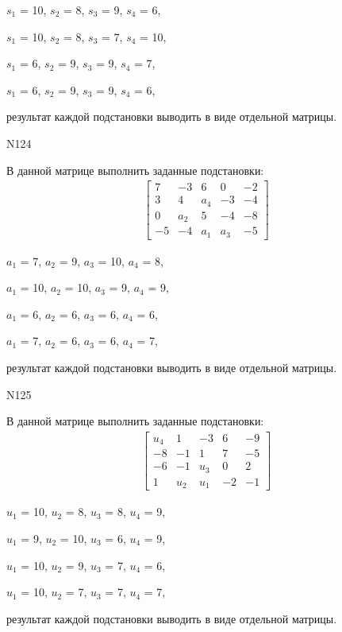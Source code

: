 \documentclass[11pt]{report}
\begin{document}
$s_{1}$ = 10, $s_{2}$ = 8, $s_{3}$ = 9, $s_{4}$ = 6, 

$s_{1}$ = 10, $s_{2}$ = 8, $s_{3}$ = 7, $s_{4}$ = 10, 

$s_{1}$ = 6, $s_{2}$ = 9, $s_{3}$ = 9, $s_{4}$ = 7, 

$s_{1}$ = 6, $s_{2}$ = 9, $s_{3}$ = 9, $s_{4}$ = 6, 

результат каждой подстановки выводить в виде отдельной матрицы.

N124

В данной матрице выполнить заданные подстановки:
\begin{align*}
\left[\begin{matrix}7 & -3 & 6 & 0 & -2\\3 & 4 & a_{4} & -3 & -4\\0 & a_{2} & 5 & -4 & -8\\-5 & -4 & a_{1} & a_{3} & -5\end{matrix}\right]
\end{align*}


$a_{1}$ = 7, $a_{2}$ = 9, $a_{3}$ = 10, $a_{4}$ = 8, 

$a_{1}$ = 10, $a_{2}$ = 10, $a_{3}$ = 9, $a_{4}$ = 9, 

$a_{1}$ = 6, $a_{2}$ = 6, $a_{3}$ = 6, $a_{4}$ = 6, 

$a_{1}$ = 7, $a_{2}$ = 6, $a_{3}$ = 6, $a_{4}$ = 7, 

результат каждой подстановки выводить в виде отдельной матрицы.

N125

В данной матрице выполнить заданные подстановки:
\begin{align*}
\left[\begin{matrix}u_{4} & 1 & -3 & 6 & -9\\-8 & -1 & 1 & 7 & -5\\-6 & -1 & u_{3} & 0 & 2\\1 & u_{2} & u_{1} & -2 & -1\end{matrix}\right]
\end{align*}


$u_{1}$ = 10, $u_{2}$ = 8, $u_{3}$ = 8, $u_{4}$ = 9, 

$u_{1}$ = 9, $u_{2}$ = 10, $u_{3}$ = 6, $u_{4}$ = 9, 

$u_{1}$ = 10, $u_{2}$ = 9, $u_{3}$ = 7, $u_{4}$ = 6, 

$u_{1}$ = 10, $u_{2}$ = 7, $u_{3}$ = 7, $u_{4}$ = 7, 

результат каждой подстановки выводить в виде отдельной матрицы.
\end{document}
